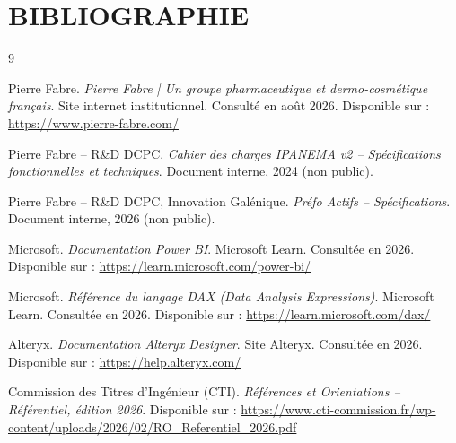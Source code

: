 \documentclass[11pt]{report}
\newcommand*{\blankpage}{%
	\vspace*{\fill}
	{\centering This page intentionally left blank. \par}
	\vspace{\fill}}
\begin{document}
{}	


 
%

%


	
\tableofcontents
\mtcaddchapter %
\newpage
\listoffigures
{}

	
\setcounter{minitocdepth}{2}






%
%
\part*{BIBLIOGRAPHIE}
\begin{thebibliography}{9}

Pierre Fabre. \textit{Pierre Fabre | Un groupe pharmaceutique et dermo-cosmétique français}. Site internet institutionnel. Consulté en août 2026. Disponible sur : \url{https://www.pierre-fabre.com/}

Pierre Fabre -- R\&D DCPC. \textit{Cahier des charges IPANEMA v2 -- Spécifications fonctionnelles et techniques}. Document interne, 2024 (non public).

Pierre Fabre -- R\&D DCPC, Innovation Galénique. \textit{Préfo Actifs -- Spécifications}. Document interne, 2026 (non public).

Microsoft. \textit{Documentation Power BI}. Microsoft Learn. Consultée en 2026. Disponible sur : \url{https://learn.microsoft.com/power-bi/}

Microsoft. \textit{Référence du langage DAX (Data Analysis Expressions)}. Microsoft Learn. Consultée en 2026. Disponible sur : \url{https://learn.microsoft.com/dax/}

Alteryx. \textit{Documentation Alteryx Designer}. Site Alteryx. Consultée en 2026. Disponible sur : \url{https://help.alteryx.com/}

Commission des Titres d'Ingénieur (CTI). \textit{Références et Orientations -- Référentiel, édition 2026}. Disponible sur : \url{https://www.cti-commission.fr/wp-content/uploads/2026/02/RO_Referentiel_2026.pdf}
\end{thebibliography}


\end{document}
